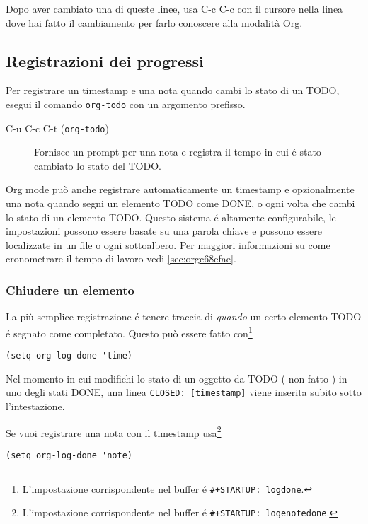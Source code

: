 \documentclass[11pt]{article}
\begin{document}
Dopo aver cambiato una di queste linee, usa C-c C-c con il
cursore nella linea dove hai fatto il cambiamento per farlo conoscere
alla modalità Org.

\subsection{Registrazioni dei progressi}
\label{sec:org642a354}
Per registrare un timestamp e una nota quando cambi lo stato di un
TODO, esegui il comando \texttt{org-todo} con un argomento prefisso.

\begin{description}
\item[{C-u C-c C-t (\texttt{org-todo})}] Fornisce un prompt per una nota e registra il tempo in cui é stato
cambiato lo stato del TODO.
\end{description}

Org mode può anche registrare automaticamente un timestamp e
opzionalmente una nota quando segni un elemento TODO come DONE, o ogni
volta che cambi lo stato di un elemento TODO. Questo sistema é
altamente configurabile, le impostazioni possono essere basate su una
parola chiave e possono essere localizzate in un file o ogni
sottoalbero. Per maggiori informazioni su come cronometrare il tempo
di lavoro vedi \ref{sec:orgc68efae}.

\subsubsection*{Chiudere un elemento}
\label{sec:org66339d3}
La più semplice registrazione é tenere traccia di \emph{quando} un certo
elemento TODO é segnato come completato. Questo può essere fatto
con\footnote{L'impostazione corrispondente nel buffer é \texttt{\#+STARTUP: logdone}.}

\begin{verbatim}
(setq org-log-done 'time)
\end{verbatim}

Nel momento in cui modifichi lo stato di un oggetto da TODO ( non
fatto ) in uno degli stati DONE, una linea \texttt{CLOSED: [timestamp]} viene
inserita subito sotto l'intestazione.

Se vuoi registrare una nota con il timestamp usa\footnote{L'impostazione corrispondente nel buffer é \texttt{\#+STARTUP:
logenotedone}.}

\begin{verbatim}
(setq org-log-done 'note)
\end{verbatim}
\end{document}
